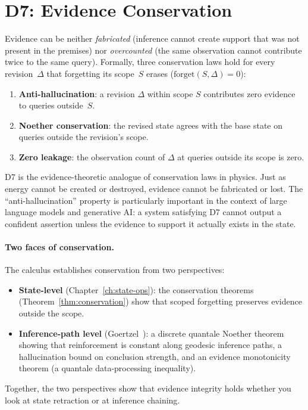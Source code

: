 \documentclass[11pt,openany]{report}
\begin{document}
\section{D7: Evidence Conservation}
\label{sec:d7}

\begin{definition}
\label{def:d7}
Evidence can be neither \emph{fabricated} (inference cannot create
support that was not present in the premises) nor \emph{overcounted}
(the same observation cannot contribute twice to the same query).
Formally, three conservation laws hold for every revision~$\Delta$ that
forgetting its scope~$S$ erases ($\mathrm{forget}(S, \Delta) = 0$):
\begin{enumerate}
\item \textbf{Anti-hallucination}: a revision $\Delta$ within scope
  $S$ contributes zero evidence to queries outside~$S$.
\item \textbf{Noether conservation}: the revised state agrees with the
  base state on queries outside the revision's scope.
\item \textbf{Zero leakage}: the observation count of $\Delta$ at
  queries outside its scope is zero.
\end{enumerate}
\end{definition}

\noindent
D7 is the evidence-theoretic analogue of conservation laws in physics.
Just as energy cannot be created or destroyed, evidence cannot be
fabricated or lost.  The ``anti-hallucination'' property is
particularly important in the context of large language models and
generative AI: a system satisfying D7 cannot output a confident
assertion unless the evidence to support it actually exists in the
state.

\paragraph{Two faces of conservation.}
The calculus establishes conservation from two perspectives:
\begin{itemize}
\item \textbf{State-level} (Chapter~\ref{ch:state-ops}): the
  conservation theorems (Theorem~\ref{thm:conservation}) show that
  scoped forgetting preserves evidence outside the scope.
\item \textbf{Inference-path level}
  (Goertzel~\cite{GoertzelEvidenceConservation2026}): a discrete
  quantale Noether theorem showing that reinforcement is constant
  along geodesic inference paths, a hallucination bound on conclusion
  strength, and an evidence monotonicity theorem (a quantale
  data-processing inequality).
\end{itemize}
Together, the two perspectives show that evidence integrity holds
whether you look at state retraction or at inference chaining.
\end{document}
